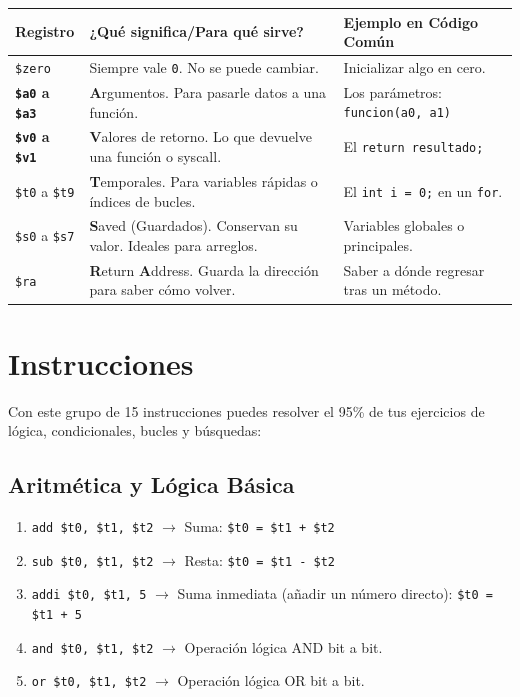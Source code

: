 \documentclass[10pt, a4paper]{article}
\begin{document}
\begin{table}[h!]
\centering
\small
\begin{tabular}{lll}
\toprule
\textbf{Registro} & \textbf{¿Qué significa/Para qué sirve?} & \textbf{Ejemplo en Código Común} \\ \midrule
\texttt{\$zero}   & Siempre vale \texttt{0}. No se puede cambiar. & Inicializar algo en cero. \\
\textbf{\texttt{\$a0} a \texttt{\$a3}} & \textbf{A}rgumentos. Para pasarle datos a una función. & Los parámetros: \texttt{funcion(a0, a1)} \\
\textbf{\texttt{\$v0} a \texttt{\$v1}} & \textbf{V}alores de retorno. Lo que devuelve una función o syscall. & El \texttt{return resultado;} \\
\texttt{\$t0} a \texttt{\$t9} & \textbf{T}emporales. Para variables rápidas o índices de bucles. & El \texttt{int i = 0;} en un \texttt{for}. \\
\texttt{\$s0} a \texttt{\$s7} & \textbf{S}aved (Guardados). Conservan su valor. Ideales para arreglos. & Variables globales o principales. \\
\texttt{\$ra}      & \textbf{R}eturn \textbf{A}ddress. Guarda la dirección para saber cómo volver. & Saber a dónde regresar tras un método. \\
\bottomrule
\end{tabular}
\end{table}

\section{Instrucciones}
Con este grupo de 15 instrucciones puedes resolver el 95\% de tus ejercicios de lógica, condicionales, bucles y búsquedas:

\subsection{Aritmética y Lógica Básica}
\begin{enumerate}
    \item \texttt{add \$t0, \$t1, \$t2} $\rightarrow$ Suma: \texttt{\$t0 = \$t1 + \$t2}
    \item \texttt{sub \$t0, \$t1, \$t2} $\rightarrow$ Resta: \texttt{\$t0 = \$t1 - \$t2}
    \item \texttt{addi \$t0, \$t1, 5}  $\rightarrow$ Suma inmediata (añadir un número directo): \texttt{\$t0 = \$t1 + 5}
    \item \texttt{and \$t0, \$t1, \$t2} $\rightarrow$ Operación lógica AND bit a bit.
    \item \texttt{or \$t0, \$t1, \$t2}  $\rightarrow$ Operación lógica OR bit a bit.
\end{enumerate}
\end{document}
